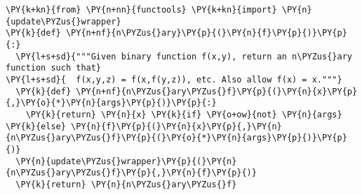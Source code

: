 \begin{Verbatim}[commandchars=\\\{\}]
\PY{k+kn}{from} \PY{n+nn}{functools} \PY{k+kn}{import} \PY{n}{update\PYZus{}wrapper}
\PY{k}{def} \PY{n+nf}{n\PYZus{}ary}\PY{p}{(}\PY{n}{f}\PY{p}{)}\PY{p}{:}
  \PY{l+s+sd}{"""Given binary function f(x,y), return an n\PYZus{}ary function such that}
\PY{l+s+sd}{  f(x,y,z) = f(x,f(y,z)), etc. Also allow f(x) = x."""}
  \PY{k}{def} \PY{n+nf}{n\PYZus{}ary\PYZus{}f}\PY{p}{(}\PY{n}{x}\PY{p}{,}\PY{o}{*}\PY{n}{args}\PY{p}{)}\PY{p}{:}
    \PY{k}{return} \PY{n}{x} \PY{k}{if} \PY{o+ow}{not} \PY{n}{args} \PY{k}{else} \PY{n}{f}\PY{p}{(}\PY{n}{x}\PY{p}{,}\PY{n}{n\PYZus{}ary\PYZus{}f}\PY{p}{(}\PY{o}{*}\PY{n}{args}\PY{p}{)}\PY{p}{)}
  \PY{n}{update\PYZus{}wrapper}\PY{p}{(}\PY{n}{n\PYZus{}ary\PYZus{}f}\PY{p}{,}\PY{n}{f}\PY{p}{)}
  \PY{k}{return} \PY{n}{n\PYZus{}ary\PYZus{}f}
\end{Verbatim}
